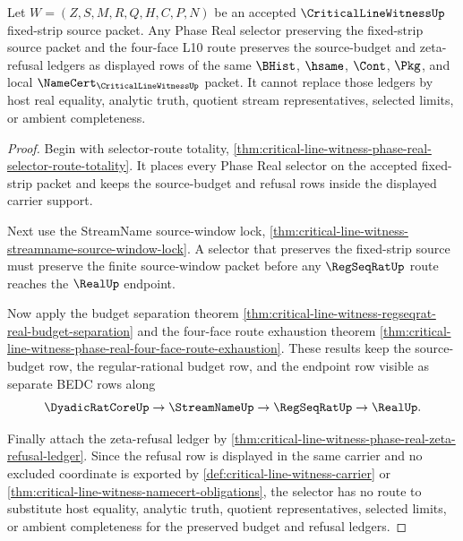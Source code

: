 \begin{theorem}
\label{thm:critical-line-witness-phase-real-selector-budget-nonescape}
Let $W=(Z,S,M,R,Q,H,C,P,N)$ be an accepted $\CriticalLineWitnessUp$ fixed-strip source packet. Any Phase Real selector preserving the fixed-strip source packet and the four-face L10 route preserves the source-budget and zeta-refusal ledgers as displayed rows of the same $\BHist$, $\hsame$, $\Cont$, $\Pkg$, and local $\NameCert_{\CriticalLineWitnessUp}$ packet. It cannot replace those ledgers by host real equality, analytic truth, quotient stream representatives, selected limits, or ambient completeness.
\end{theorem}
\begin{proof}
Begin with selector-route totality, \autoref{thm:critical-line-witness-phase-real-selector-route-totality}. It places every Phase Real selector on the accepted fixed-strip packet and keeps the source-budget and refusal rows inside the displayed carrier support.

Next use the StreamName source-window lock, \autoref{thm:critical-line-witness-streamname-source-window-lock}. A selector that preserves the fixed-strip source must preserve the finite source-window packet before any $\RegSeqRatUp$ route reaches the $\RealUp$ endpoint.

Now apply the budget separation theorem \autoref{thm:critical-line-witness-regseqrat-real-budget-separation} and the four-face route exhaustion theorem \autoref{thm:critical-line-witness-phase-real-four-face-route-exhaustion}. These results keep the source-budget row, the regular-rational budget row, and the endpoint row visible as separate BEDC rows along
$$
\DyadicRatCoreUp \to \StreamNameUp \to \RegSeqRatUp \to \RealUp .
$$

Finally attach the zeta-refusal ledger by \autoref{thm:critical-line-witness-phase-real-zeta-refusal-ledger}. Since the refusal row is displayed in the same carrier and no excluded coordinate is exported by \autoref{def:critical-line-witness-carrier} or \autoref{thm:critical-line-witness-namecert-obligations}, the selector has no route to substitute host equality, analytic truth, quotient representatives, selected limits, or ambient completeness for the preserved budget and refusal ledgers.
\end{proof}
